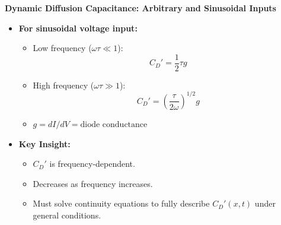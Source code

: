 		\begin{frame}{\textbf{Dynamic Diffusion Capacitance: Arbitrary and Sinusoidal Inputs}}
			\begin{itemize}			
				\item \textbf{For sinusoidal voltage input:}
				\begin{itemize}
					\item Low frequency ($\omega \tau \ll 1$):
					\[
					C_D' = \frac{1}{2} \tau g \tag{3-32}
					\]
					\item High frequency ($\omega \tau \gg 1$):
					\[
					C_D' = \left( \frac{\tau}{2\omega} \right)^{1/2} g \tag{3-33}
					\]
					\item $g = dI/dV = \text{diode conductance}$
				\end{itemize}
			
				\item \textbf{Key Insight:}
				\begin{itemize}
					\item $C_D'$ is frequency-dependent.
					\item Decreases as frequency increases.
					\item Must solve continuity equations to fully describe $C_D'(x,t)$ under general conditions.
				\end{itemize}
			\end{itemize}
			\end{frame}	